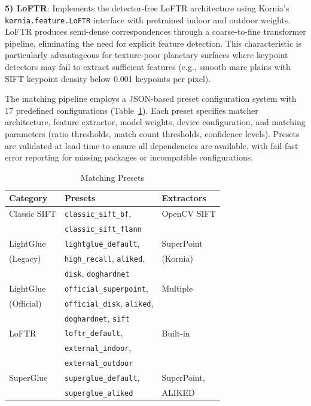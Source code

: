 \documentclass[lettersize,journal]{IEEEtran}
\begin{document}
\textbf{5) LoFTR}: Implements the detector-free LoFTR architecture \cite{sun2021loftr} using Kornia's \texttt{kornia.feature.LoFTR} interface with pretrained indoor and outdoor weights. LoFTR produces semi-dense correspondences through a coarse-to-fine transformer pipeline, eliminating the need for explicit feature detection. This characteristic is particularly advantageous for texture-poor planetary surfaces where keypoint detectors may fail to extract sufficient features (e.g., smooth mare plains with SIFT keypoint density below 0.001 keypoints per pixel).

The matching pipeline employs a JSON-based preset configuration system with 17 predefined configurations (Table~\ref{tab:presets}). Each preset specifies matcher architecture, feature extractor, model weights, device configuration, and matching parameters (ratio thresholds, match count thresholds, confidence levels). Presets are validated at load time to ensure all dependencies are available, with fail-fast error reporting for missing packages or incompatible configurations.

\begin{table}[htbp]
\caption{Matching Presets}
\label{tab:presets}
\centering
\small
\begin{tabular}{@{}lll@{}}
\toprule
\textbf{Category} & \textbf{Presets} & \textbf{Extractors} \\
\midrule
Classic SIFT & \texttt{classic\_sift\_bf}, & OpenCV SIFT \\
 & \texttt{classic\_sift\_flann} &  \\
LightGlue & \texttt{lightglue\_default}, & SuperPoint \\
(Legacy) & \texttt{high\_recall}, \texttt{aliked}, & (Kornia) \\
 & \texttt{disk}, \texttt{doghardnet} &  \\
LightGlue & \texttt{official\_superpoint}, & Multiple \\
(Official) & \texttt{official\_disk}, \texttt{aliked}, &  \\
 & \texttt{doghardnet}, \texttt{sift} &  \\
LoFTR & \texttt{loftr\_default}, & Built-in \\
 & \texttt{external\_indoor}, &  \\
 & \texttt{external\_outdoor} &  \\
SuperGlue & \texttt{superglue\_default}, & SuperPoint, \\
 & \texttt{superglue\_aliked} & ALIKED \\
\bottomrule
\end{tabular}
\end{table}
\end{document}
